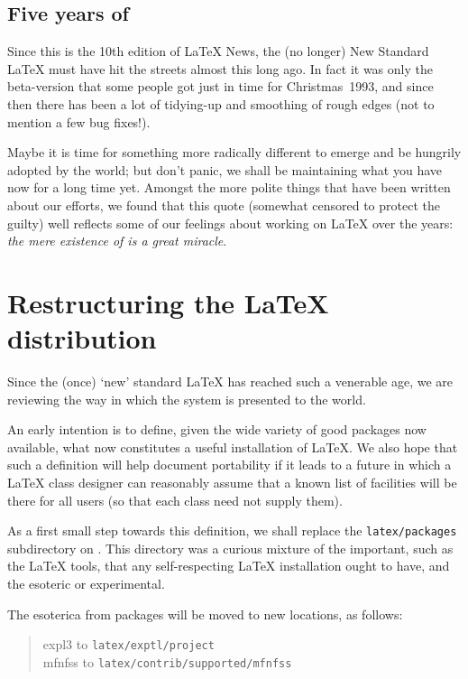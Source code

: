 \documentclass{ltnews}
\providecommand\file[1]{\texttt{#1}}
\begin{document}
\maketitle


\subsection{Five years of \LaTeXe}

Since this is the 10th edition of \LaTeX{} News, the (no longer) New
Standard \LaTeX{} must have hit the streets almost this long ago.  In
fact it was only the beta-version that some people got just in time for
Christmas~1993, and since then there has been a lot of tidying-up and
smoothing of rough edges (not to mention a few bug fixes!).

Maybe it is time for something more radically different to emerge and
be hungrily adopted by the world; but don't panic, we shall be
maintaining what you have now for a long time yet.  Amongst the more
polite things that have been written about our efforts, we found that this
quote (somewhat censored to protect the guilty) well reflects some of
our feelings about working on \LaTeX{} over the years: \textit{the mere
existence of \LaTeXe{} is a great miracle}.


  \section{Restructuring the \LaTeX{} distribution}

  Since the (once) `new' standard \LaTeX{} has reached such a venerable
  age, we are reviewing the way in which the system is presented to the
  world.

  An early intention is to define, given the wide variety of good
  packages now available, what now constitutes a useful installation of
  \LaTeX{}. We also hope that such a definition will help document
  portability if it leads to a future in which a \LaTeX{} class
  designer can reasonably assume that a known list of
  facilities will be there for all users (so that each class
  need not supply them).

  As a first small step towards this definition, we shall replace the
  \file{latex/packages} subdirectory on \ctan{}.
  This directory was a curious mixture of the important, such as the
  \LaTeX{} \textsf{tools}, that any self-respecting \LaTeX{}
  installation ought to have, and the esoteric or experimental.

  The esoterica from \textsf{packages} will be moved to
  new locations, as follows:
  \begin{quote}
    \textsf{expl3}  to \file{latex/exptl/project}\\
    \textsf{mfnfss} to \file{latex/contrib/supported/mfnfss}
  \end{quote}
\end{document}
